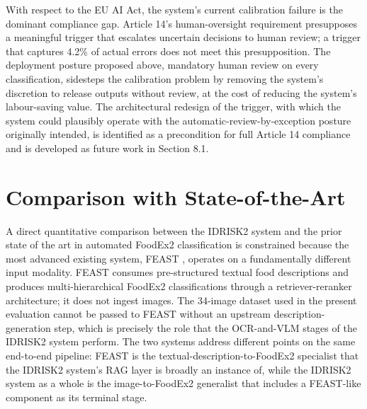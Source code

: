 With respect to the EU AI Act, the system's current calibration failure is the dominant compliance gap. Article 14's human-oversight requirement presupposes a meaningful trigger that escalates uncertain decisions to human review; a trigger that captures 4.2\% of actual errors does not meet this presupposition. The deployment posture proposed above, mandatory human review on every classification, sidesteps the calibration problem by removing the system's discretion to release outputs without review, at the cost of reducing the system's labour-saving value. The architectural redesign of the trigger, with which the system could plausibly operate with the automatic-review-by-exception posture originally intended, is identified as a precondition for full Article 14 compliance and is developed as future work in Section 8.1.

\hypertarget{comparison-with-state-of-the-art}{%
\section{Comparison with State-of-the-Art}\label{comparison-with-state-of-the-art}}

A direct quantitative comparison between the IDRISK2 system and the prior state of the art in automated FoodEx2 classification is constrained because the most advanced existing system, FEAST \parencite{lorenzo_molfetta_47d7c4cd}, operates on a fundamentally different input modality. FEAST consumes pre-structured textual food descriptions and produces multi-hierarchical FoodEx2 classifications through a retriever-reranker architecture; it does not ingest images. The 34-image dataset used in the present evaluation cannot be passed to FEAST without an upstream description-generation step, which is precisely the role that the OCR-and-VLM stages of the IDRISK2 system perform. The two systems address different points on the same end-to-end pipeline: FEAST is the textual-description-to-FoodEx2 specialist that the IDRISK2 system's RAG layer is broadly an instance of, while the IDRISK2 system as a whole is the image-to-FoodEx2 generalist that includes a FEAST-like component as its terminal stage.

